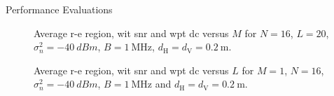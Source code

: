 \begin{section}{Performance Evaluations}
	\begin{figure}[!t]
		\centering
		\caption{Average \gls{r-e} region, \gls{wit} \gls{snr} and \gls{wpt} \gls{dc} versus $M$ for $N=16$, $L=20$, $\sigma_n^2=\qty{-40}{dBm}$, $B=\qty{1}{\MHz}$, $d_{\mathrm{H}}=d_{\mathrm{V}}=\qty{0.2}{\meter}$.}
	\end{figure}

	\begin{figure}[!t]
		\centering
		\caption{Average \gls{r-e} region, \gls{wit} \gls{snr} and \gls{wpt} \gls{dc} versus $L$ for $M=1$, $N=16$, $\sigma_n^2=\qty{-40}{dBm}$, $B=\qty{1}{\MHz}$ and $d_{\mathrm{H}}=d_{\mathrm{V}}=\qty{0.2}{\meter}$.}
	\end{figure}


\end{section}
